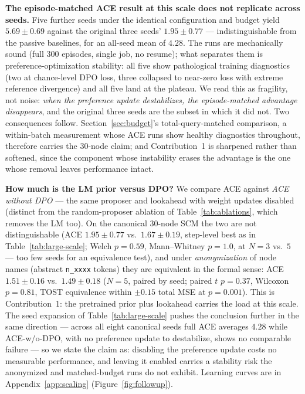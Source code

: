 \documentclass[twoside]{article}
\theoremstyle{plain}
\theoremstyle{definition}
\theoremstyle{remark}
\begin{document}
\textbf{The episode-matched ACE result at this scale does not replicate across seeds.} Five further seeds under the identical configuration and budget yield $5.69\pm0.69$ against the original three seeds' $1.95\pm0.77$ --- indistinguishable from the passive baselines, for an all-seed mean of $4.28$. The runs are mechanically sound (full 300 episodes, single job, no resume); what separates them is preference-optimization stability: all five show pathological training diagnostics (two at chance-level DPO loss, three collapsed to near-zero loss with extreme reference divergence) and all five land at the plateau. We read this as fragility, not noise: \emph{when the preference update destabilizes, the episode-matched advantage disappears}, and the original three seeds are the subset in which it did not. Two consequences follow. Section~\ref{sec:budget}'s total-query-matched comparison, a within-batch measurement whose ACE runs show healthy diagnostics throughout, therefore carries the 30-node claim; and Contribution~1 is sharpened rather than softened, since the component whose instability erases the advantage is the one whose removal leaves performance intact.

\textbf{How much is the LM prior versus DPO?} We compare ACE against \emph{ACE without DPO} --- the same proposer and lookahead with weight updates disabled (distinct from the random-proposer ablation of Table~\ref{tab:ablations}, which removes the LM too). On the canonical 30-node SCM the two are not distinguishable (ACE $1.95\pm0.77$ vs.\ $1.67\pm0.19$, step-level best as in Table~\ref{tab:large-scale}; Welch $p=0.59$, Mann--Whitney $p=1.0$, at $N{=}3$ vs.\ $5$ --- too few seeds for an equivalence test), and under \emph{anonymization} of node names (abstract \texttt{n\_xxxx} tokens) they are equivalent in the formal sense: ACE $1.51\pm0.16$ vs.\ $1.49\pm0.18$ ($N{=}5$, paired by seed; paired $t$ $p=0.37$, Wilcoxon $p=0.81$, TOST equivalence within $\pm0.15$ total MSE at $p=0.001$). This is Contribution~1: the pretrained prior plus lookahead carries the load at this scale. The seed expansion of Table~\ref{tab:large-scale} pushes the conclusion further in the same direction --- across all eight canonical seeds full ACE averages $4.28$ while ACE-w/o-DPO, with no preference update to destabilize, shows no comparable failure --- so we state the claim as: disabling the preference update costs no measurable performance, and leaving it enabled carries a stability risk the anonymized and matched-budget runs do not exhibit. Learning curves are in Appendix~\ref{app:scaling} (Figure~\ref{fig:followup}).
\end{document}
